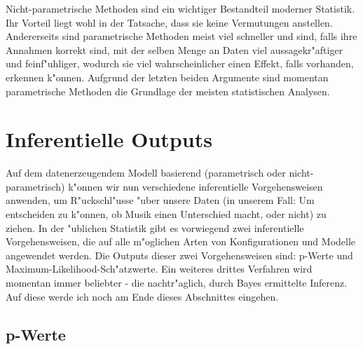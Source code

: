 \documentclass[a4paper,twoside]{tufte-book}\usepackage[]{graphicx}\usepackage[]{color}
\begin{document}
Nicht-parametrische Methoden sind ein wichtiger Bestandteil moderner Statistik. Ihr Vorteil liegt wohl in der Tatsache, dass sie keine Vermutungen anstellen. Andererseits sind parametrische Methoden meist viel schneller und sind, falls ihre Annahmen korrekt sind, mit der selben Menge an Daten viel aussagekr"aftiger und feinf"uhliger, wodurch sie viel wahrscheinlicher einen Effekt, falls vorhanden, erkennen k"onnen. Aufgrund der letzten beiden Argumente sind momentan parametrische Methoden die Grundlage der meisten statistischen Analysen.


\section{Inferentielle Outputs}

Auf dem datenerzeugendem Modell basierend (parametrisch oder nicht-parametrisch) k"onnen wir nun verschiedene inferentielle Vorgehensweisen anwenden, um R"uckschl"usse "uber unsere Daten (in unserem Fall: Um entscheiden zu k"onnen, ob Musik einen Unterschied macht, oder nicht) zu ziehen. In der "ublichen Statistik gibt es vorwiegend zwei inferentielle Vorgehensweisen, die auf alle m"oglichen Arten von Konfigurationen und Modelle angewendet werden. Die Outputs dieser zwei Vorgehensweisen sind: p-Werte und Maximum-Likelihood-Sch"atzwerte. Ein weiteres drittes Verfahren wird momentan immer beliebter - die nachtr"aglich, durch Bayes ermittelte Inferenz. Auf diese werde ich noch am Ende dieses Abschnittes eingehen.

\subsection{p-Werte}
\end{document}
